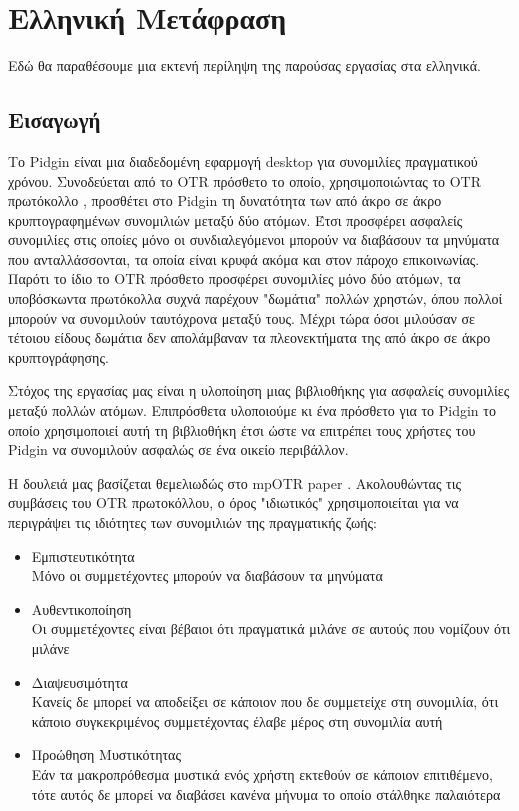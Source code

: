 \chapter{Ελληνική Μετάφραση}
\label{appendices:greek}

Εδώ θα παραθέσουμε μια εκτενή περίληψη της παρούσας εργασίας στα ελληνικά.


\section{Εισαγωγή}
Το Pidgin είναι μια διαδεδομένη εφαρμογή desktop για συνομιλίες πραγματικού χρόνου.
Συνοδεύεται από το OTR πρόσθετο το οποίο, χρησιμοποιώντας το OTR πρωτόκολλο \cite{otr} \cite{otr_improvedauth} \cite{otr_userstudy}, προσθέτει στο Pidgin τη δυνατότητα των από άκρο σε άκρο κρυπτογραφημένων συνομιλιών μεταξύ δύο ατόμων.
Έτσι προσφέρει ασφαλείς συνομιλίες στις οποίες μόνο οι συνδιαλεγόμενοι μπορούν να διαβάσουν τα μηνύματα που ανταλλάσσονται, τα οποία είναι κρυφά ακόμα και στον πάροχο επικοινωνίας.
Παρότι το ίδιο το OTR πρόσθετο προσφέρει συνομιλίες μόνο δύο ατόμων, τα υποβόσκωντα πρωτόκολλα συχνά παρέχουν "δωμάτια" πολλών χρηστών, όπου πολλοί μπορούν να συνομιλούν ταυτόχρονα μεταξύ τους.
Μέχρι τώρα όσοι μιλούσαν σε τέτοιου είδους δωμάτια δεν απολάμβαναν τα πλεονεκτήματα της από άκρο σε άκρο κρυπτογράφησης.

Στόχος της εργασίας μας είναι η υλοποίηση μιας βιβλιοθήκης για ασφαλείς συνομιλίες μεταξύ πολλών ατόμων.
Επιπρόσθετα υλοποιούμε κι ένα πρόσθετο για το Pidgin το οποίο χρησιμοποιεί αυτή τη βιβλιοθήκη έτσι ώστε να επιτρέπει τους χρήστες του Pidgin να συνομιλούν ασφαλώς σε ένα οικείο περιβάλλον.

Η δουλειά μας βασίζεται θεμελιωδώς στο mpOTR paper \cite{mpotr}.
Ακολουθώντας τις συμβάσεις του OTR πρωτοκόλλου, ο όρος "ιδιωτικός" χρησιμοποιείται για να περιγράψει τις ιδιότητες των συνομιλιών της πραγματικής ζωής:

\begin{itemize}
  \item Εμπιστευτικότητα\\
    Μόνο οι συμμετέχοντες μπορούν να διαβάσουν τα μηνύματα\\[0.2cm]

  \item Αυθεντικοποίηση\\
    Οι συμμετέχοντες είναι βέβαιοι ότι πραγματικά μιλάνε σε αυτούς που νομίζουν ότι μιλάνε\\[0.2cm]

  \item Διαψευσιμότητα\\
    Κανείς δε μπορεί να αποδείξει σε κάποιον που δε συμμετείχε στη συνομιλία, ότι κάποιο συγκεκριμένος συμμετέχοντας έλαβε μέρος στη συνομιλία αυτή\\[0.2cm]

  \item Προώθηση Μυστικότητας\\
    Εάν τα μακροπρόθεσμα μυστικά ενός χρήστη εκτεθούν σε κάποιον επιτιθέμενο, τότε αυτός δε μπορεί να διαβάσει κανένα μήνυμα το οποίο στάλθηκε παλαιότερα\\[0.2cm]

\end{itemize}

